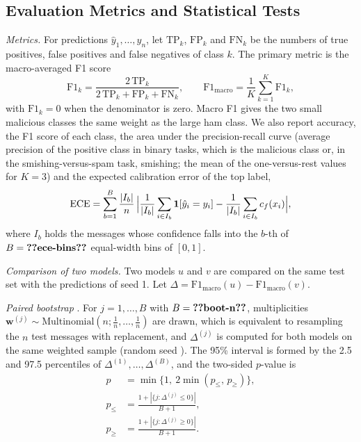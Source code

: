 \subsection{Evaluation Metrics and Statistical Tests}\label{sec:stats}

\emph{Metrics.} For predictions $\hat{y}_1,\dots,\hat{y}_n$, let $\mathrm{TP}_k$, $\mathrm{FP}_k$ and $\mathrm{FN}_k$ be the numbers of true positives, false positives and false negatives of class $k$. The primary metric is the macro-averaged F1 score
\begin{equation}\label{eq:macrof1}
\mathrm{F1}_k=\frac{2\,\mathrm{TP}_k}{2\,\mathrm{TP}_k+\mathrm{FP}_k+\mathrm{FN}_k},\qquad
\mathrm{F1}_{\mathrm{macro}}=\frac{1}{K}\sum_{k=1}^{K}\mathrm{F1}_k,
\end{equation}
with $\mathrm{F1}_k=0$ when the denominator is zero. Macro F1 gives the two small malicious classes the same weight as the large ham class. We also report accuracy, the F1 score of each class, the area under the precision-recall curve (average precision of the positive class in binary tasks, which is the malicious class or, in the smishing-versus-spam task, smishing; the mean of the one-versus-rest values for $K=3$) and the expected calibration error of the top label,
\begin{equation}\label{eq:ece}
\mathrm{ECE}=\sum_{b=1}^{B}\frac{|I_b|}{n}\,\Bigl|\frac{1}{|I_b|}\sum_{i\in I_b}\mathbf{1}[\hat{y}_i=y_i]-\frac{1}{|I_b|}\sum_{i\in I_b}c_f(x_i)\Bigr|,
\end{equation}
where $I_b$ holds the messages whose confidence falls into the $b$-th of $B=\val{ece-bins}$ equal-width bins of $[0,1]$.

\emph{Comparison of two models.} Two models $u$ and $v$ are compared on the same test set with the predictions of seed 1. Let $\Delta=\mathrm{F1}_{\mathrm{macro}}(u)-\mathrm{F1}_{\mathrm{macro}}(v)$.

\emph{Paired bootstrap} \cite{efron1993}. For $j=1,\dots,B$ with $B=\val{boot-n}$, multiplicities $\mathbf{w}^{(j)}\sim\mathrm{Multinomial}(n;\tfrac{1}{n},\dots,\tfrac{1}{n})$ are drawn, which is equivalent to resampling the $n$ test messages with replacement, and $\Delta^{(j)}$ is computed for both models on the same weighted sample (random seed ). The 95\% interval is formed by the 2.5 and 97.5 percentiles of $\Delta^{(1)},\dots,\Delta^{(B)}$, and the two-sided $p$-value is
\begin{equation}\label{eq:bootp}
\begin{aligned}
p&=\min\bigl\{1,\ 2\min(p_{\le},\,p_{\ge})\bigr\},\\
p_{\le}&=\frac{1+|\{j:\Delta^{(j)}\le 0\}|}{B+1},\\
p_{\ge}&=\frac{1+|\{j:\Delta^{(j)}\ge 0\}|}{B+1}.
\end{aligned}
\end{equation}


